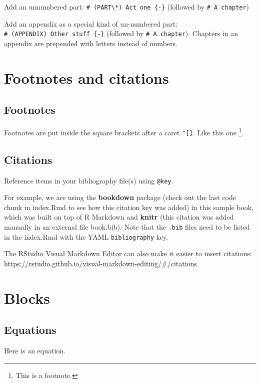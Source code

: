 \documentclass[]{book}
\begin{document}
Add an unnumbered part:
\texttt{\#\ (PART\textbackslash{}*)\ Act\ one\ \{-\}} (followed by
\texttt{\#\ A\ chapter})

Add an appendix as a special kind of un-numbered part:
\texttt{\#\ (APPENDIX)\ Other\ stuff\ \{-\}} (followed by
\texttt{\#\ A\ chapter}). Chapters in an appendix are prepended with
letters instead of numbers.

\chapter{Footnotes and citations}\label{footnotes-and-citations}

\section{Footnotes}\label{footnotes}

Footnotes are put inside the square brackets after a caret
\texttt{\^{}{[}{]}}. Like this one \footnote{This is a footnote.}.

\section{Citations}\label{citations}

Reference items in your bibliography file(s) using \texttt{@key}.

For example, we are using the \textbf{bookdown} package
\citep{R-bookdown} (check out the last code chunk in index.Rmd to see
how this citation key was added) in this sample book, which was built on
top of R Markdown and \textbf{knitr} \citep{xie2015} (this citation was
added manually in an external file book.bib). Note that the
\texttt{.bib} files need to be listed in the index.Rmd with the YAML
\texttt{bibliography} key.

The RStudio Visual Markdown Editor can also make it easier to insert
citations:
\url{https://rstudio.github.io/visual-markdown-editing/\#/citations}

\chapter{Blocks}\label{blocks}

\section{Equations}\label{equations}

Here is an equation.
\end{document}
